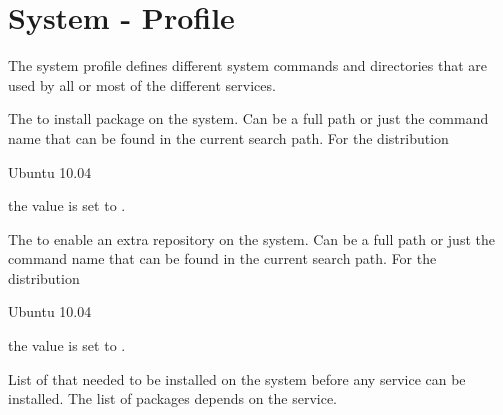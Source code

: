 \label{sec:system_profile}
\section{System - Profile}

The system profile defines different system commands and directories
that are used by all or most of the different services.


The  to install package on the system. Can be a full path or
just the command name that can be found in the current search path. 
For the distribution
\begin{inparaitem}
\item[\TheDistribution{ubuntu}] Ubuntu 10.04
\end{inparaitem}
the value is set to .


The  to enable an extra repository on the system. Can be a full path or
just the command name that can be found in the current search path. 
For the distribution
\begin{inparaitem}
\item[\TheDistribution{ubuntu}] Ubuntu 10.04
\end{inparaitem}
the value is set to .


List of  that needed to be installed on the system before any
service can be installed. The list of packages depends on the service.
